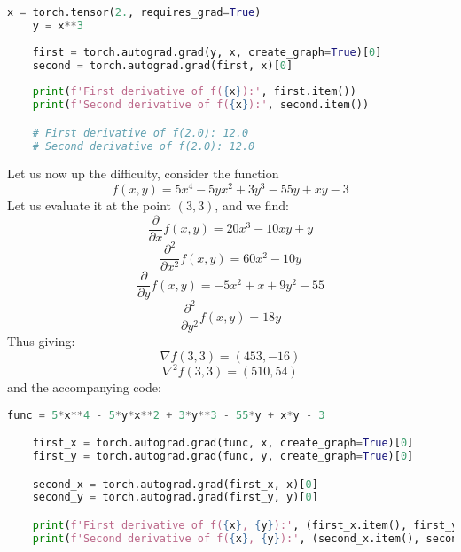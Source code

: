 \documentclass[12pt]{article}
\begin{document}
{\begin{lstlisting}[language=Python]
    x = torch.tensor(2., requires_grad=True)
    y = x**3
    
    first = torch.autograd.grad(y, x, create_graph=True)[0]
    second = torch.autograd.grad(first, x)[0]
    
    print(f'First derivative of f({x}):', first.item())
    print(f'Second derivative of f({x}):', second.item())

    # First derivative of f(2.0): 12.0
    # Second derivative of f(2.0): 12.0
\end{lstlisting}
Let us now up the difficulty, consider the function
\begin{equation*}
    f(x, y) = 5x^4 - 5yx^2 + 3y^3 - 55y + xy - 3
\end{equation*}
Let us evaluate it at the point $(3, 3)$, and we find:
\begin{equation*}
    \frac{\partial}{\partial x} f(x, y) = 20x^3 - 10xy + y
\end{equation*}
\begin{equation*}
    \frac{\partial^2}{\partial x^2} f(x, y) = 60x^2 - 10y 
\end{equation*}
\begin{equation*}
    \frac{\partial}{\partial y} f(x, y) = -5x^2 + x + 9y^2 - 55
\end{equation*}
\begin{equation*}
    \frac{\partial^2}{\partial y^2} f(x, y) = 18y
\end{equation*}
Thus giving:
\begin{equation*}
    \nabla f(3, 3) = (453, -16)
\end{equation*}
\begin{equation*}
    \nabla^2 f(3, 3) = (510, 54)
\end{equation*}
\newpage
and the accompanying code:
\begin{lstlisting}[language=Python]
    func = 5*x**4 - 5*y*x**2 + 3*y**3 - 55*y + x*y - 3

    first_x = torch.autograd.grad(func, x, create_graph=True)[0]
    first_y = torch.autograd.grad(func, y, create_graph=True)[0]

    second_x = torch.autograd.grad(first_x, x)[0]
    second_y = torch.autograd.grad(first_y, y)[0]

    print(f'First derivative of f({x}, {y}):', (first_x.item(), first_y.item()))
    print(f'Second derivative of f({x}, {y}):', (second_x.item(), second_y.item()))


\end{lstlisting}}
\end{document}
